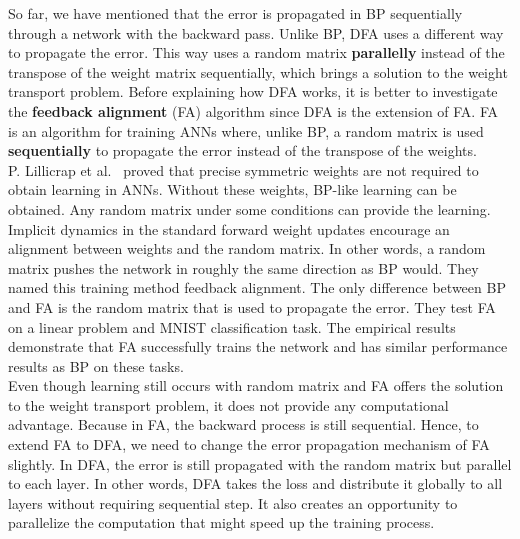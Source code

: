 \documentclass[a4paper, nobind]{templates/ociamthesis}
\begin{document}
So far, we have mentioned that the error is propagated in BP sequentially through a network with the backward pass. Unlike BP, DFA uses a different way to propagate the error. This way uses a random matrix \textbf{parallelly} instead of the transpose of the weight matrix sequentially, which brings a solution to the weight transport problem. Before explaining how DFA works, it is better to investigate the \textbf{feedback alignment} (FA) algorithm since DFA is the extension of FA. FA is an algorithm for training ANNs where, unlike BP, a random matrix is used \textbf{sequentially} to propagate the error instead of the transpose of the weights.\\
P. Lillicrap et al.~\cite{lillicrap2014random} proved that precise symmetric weights are not required to obtain learning in ANNs. Without these weights, BP-like learning can be obtained. Any random matrix under some conditions can provide the learning. Implicit dynamics in the standard forward weight updates encourage an alignment between weights and the random matrix. In other words, a random matrix pushes the network in roughly the same direction as BP would. They named this training method feedback alignment. The only difference between BP and FA is the random matrix that is used to propagate the error. They test FA on a linear problem and MNIST classification task. The empirical results demonstrate that FA successfully trains the network and has similar performance results as BP on these tasks.\\
Even though learning still occurs with random matrix and FA offers the solution to the weight transport problem, it does not provide any computational advantage. Because in FA, the backward process is still sequential. Hence, to extend FA to DFA, we need to change the error propagation mechanism of FA slightly. In DFA, the error is still propagated with the random matrix but parallel to each layer. In other words, DFA takes the loss and distribute it globally to all layers without requiring sequential step. It also creates an opportunity to parallelize the computation that might speed up the training process.
\end{document}
